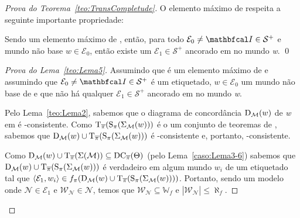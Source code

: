 \begin{apendicesenv}
\begin{proof}[Prova do Teorema~\ref{teo:TransCompletude}]
            O elemento máximo de  respeita a seguinte importante propriedade:

            \begin{lema}
                \label{teo:Lema5}
                Sendo  um elemento máximo de , então, para todo \(\mathcal{E}_{0} \neq \modeloinicial \in \mathcal{S}^{+}\) e mundo não base
                \(w \in \mathcal{E}_{0}\), então existe um \(\mathcal{E}_{1} \in \mathcal{S}^{+}\) ancorado em  no mundo \textit{w}. \qed
            \end{lema}

            \begin{proof}[Prova do Lema~\ref{teo:Lema5}]
                Assumindo que  é um elemento máximo de  e assumindo que \(\mathcal{E}_{0} \neq \modeloinicial \in \mathcal{S}^{+}\)
                é um \PImodelo etiquetado, \(w \in \mathcal{E}_{0}\) um mundo não base de  e que não há qualquer
                \(\mathcal{E}_{1} \in \mathcal{S}^{+}\) ancorado em  no mundo \textit{w}.

                Pelo Lema~\ref{teo:Lema2}, sabemos que o diagrama de concordância \(\operatorname{D}_{\mathcal{M}}(w)\) de \textit{w} em  é
                -consistente. Como \(\operatorname{T}_{\overline{\pi}}(\operatorname{S}_{\pi}(\Sigma_{\mathcal{M}}(w)))\) é o um conjunto de teoremas de ,
                sabemos que \(\operatorname{D}_{\mathcal{M}}(w) \cup \operatorname{T}_{\overline{\pi}}(\operatorname{S}_{\pi}(\Sigma_{\mathcal{M}}(w)))\) é
                -consistente e, portanto, -consistente.

                Como \(\operatorname{D}_{\mathcal{M}}(w) \cup \operatorname{T}_{\overline{\pi}}(\Sigma(\mathcal{M})) \subseteq \operatorname{DC}_{\overline{\pi}}(\Theta)\) (pelo Lema~\ref{caso:Lema3-6}) sabemos que
                \(\operatorname{D}_{\mathcal{M}}(w) \cup \operatorname{T}_{\overline{\pi}}(\operatorname{S}_{\pi}(\Sigma_{\mathcal{M}}(w)))\) é verdadeiro em algum mundo \(w_i\) de um \OPImodelo etiquetado 
                tal que \(\langle \mathcal{E}_{1}, w_i \rangle \in f_{\pi}(\operatorname{D}_{\mathcal{M}}(w) \cup \operatorname{T}_{\overline{\pi}}(\operatorname{S}_{\pi}(\Sigma_{\mathcal{M}}(w))))\).
                Portanto, sendo  um modelo onde \(\mathcal{N} \in \mathcal{E}_{1}\) e \(\mathcal{W}_{\mathcal{N}} \in \mathcal{N}\), temos que
                \(\mathcal{W}_{\mathcal{N}} \subseteq \mathbb{W}_f\) e \(|\mathcal{W}_{\mathcal{N}}| \leq \aleph_{f}\).


\end{proof}
\end{proof}
\end{apendicesenv}
